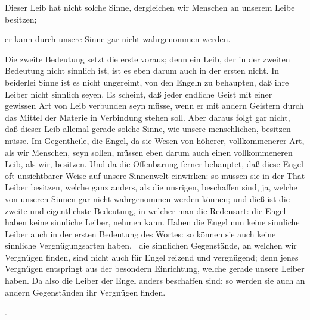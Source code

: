 \begin{aufza}
\begin{aufzb}
\begin{aufzc}
\item Dieser Leib hat nicht solche Sinne, dergleichen wir Menschen an unserem Leibe besitzen;
\item er kann durch unsere Sinne gar nicht wahrgenommen werden.
\end{aufzc}
Die zweite Bedeutung setzt die erste voraus; denn ein Leib, der in der zweiten Bedeutung nicht sinnlich ist, ist es eben darum auch in der ersten nicht. In beiderlei Sinne ist es nicht ungereimt, von den Engeln zu behaupten, daß ihre Leiber nicht sinnlich seyen. Es scheint, daß jeder endliche Geist mit einer gewissen Art von Leib verbunden seyn müsse, wenn er mit andern Geistern durch das Mittel der Materie in Verbindung stehen soll. Aber daraus folgt gar nicht, daß dieser Leib allemal gerade solche Sinne, wie unsere menschlichen, besitzen müsse. Im Gegentheile, die Engel, da sie Wesen von höherer, vollkommenerer Art, als wir Menschen, seyn sollen, müssen eben darum auch einen vollkommeneren Leib, als wir, besitzen. Und da die Offenbarung ferner behauptet, daß diese Engel oft unsichtbarer Weise auf unsere Sinnenwelt einwirken: so müssen sie in der That Leiber besitzen, welche ganz anders, als die unsrigen, beschaffen sind, ja, welche von unseren Sinnen gar nicht wahrgenommen werden können; und dieß ist die zweite und eigentlichste Bedeutung, in welcher man die Redensart: die Engel haben keine sinnliche Leiber, nehmen kann. Haben die Engel nun keine sinnliche Leiber auch in der ersten Bedeutung des Wortes: so können sie auch keine sinnliche Vergnügungsarten haben, \dh\ die sinnlichen Gegenstände, an welchen wir Vergnügen finden, sind nicht auch für Engel reizend und vergnügend; denn jenes Vergnügen entspringt aus der besondern Einrichtung, welche gerade unsere Leiber haben. Da also die Leiber der Engel anders beschaffen sind: so werden sie auch an andern Gegenständen ihr Vergnügen finden.
\end{aufzb}
\item {}.~
\begin{aufzb}

\end{aufzb}
\end{aufza}

